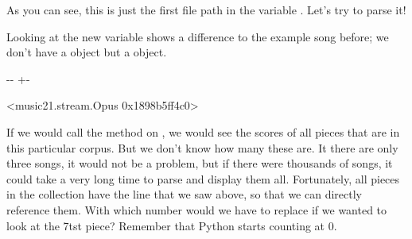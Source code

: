 \documentclass[letterpaper,10pt,english]{sphinxmanual}
\newlength\nbsphinxcodecellspacing
\begin{document}
As you can see, this is just the first file path in the variable . Let’s try to parse it!

{
\begin{sphinxVerbatim}[commandchars=\\\{\}]
\llap{\color{nbsphinxin}[13]:\,\hspace{\fboxrule}\hspace{\fboxsep}}  \PYG{p}{[}\PYG{p}{]}
\end{sphinxVerbatim}
}

Looking at the new variable  shows a difference to the example song before; we don’t have a  object but a  object.

{
\begin{sphinxVerbatim}[commandchars=\\\{\}]
\llap{\color{nbsphinxin}[14]:\,\hspace{\fboxrule}\hspace{\fboxsep}}
\end{sphinxVerbatim}
}

{

\kern-\sphinxverbatimsmallskipamount\kern-\baselineskip
\kern+\FrameHeightAdjust\kern-\fboxrule
\vspace{\nbsphinxcodecellspacing}

\begin{sphinxVerbatim}[commandchars=\\\{\}]
\llap{\color{nbsphinxout}[14]:\,\hspace{\fboxrule}\hspace{\fboxsep}}<music21.stream.Opus 0x1898b5ff4c0>
\end{sphinxVerbatim}
}

If we would call the  method on , we would see the scores of all pieces that are in this particular corpus. But we don’t know how many these are. It there are only three songs, it would not be a problem, but if there were thousands of songs, it could take a very long time to parse and display them all. Fortunately, all pieces in the collection have the  line that we saw above, so that we can directly reference them. With which number would we have to replace
 if we wanted to look at the 7tst piece? Remember that Python starts counting at 0.
\end{document}
